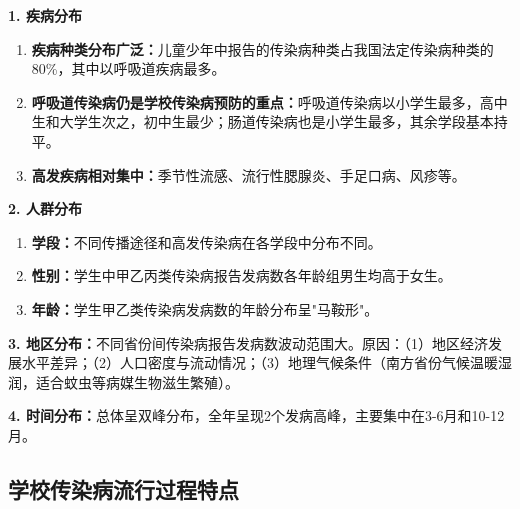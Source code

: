 \begin{keybox}
\textbf{1. 疾病分布}
\begin{enumerate}[leftmargin=*]
    \item \textbf{疾病种类分布广泛：}儿童少年中报告的传染病种类占我国法定传染病种类的80\%，其中以呼吸道疾病最多。
    \item \textbf{呼吸道传染病仍是学校传染病预防的重点：}呼吸道传染病以小学生最多，高中生和大学生次之，初中生最少；肠道传染病也是小学生最多，其余学段基本持平。
    \item \textbf{高发疾病相对集中：}季节性流感、流行性腮腺炎、手足口病、风疹等。
\end{enumerate}

\textbf{2. 人群分布}
\begin{enumerate}[leftmargin=*]
    \item \textbf{学段：}不同传播途径和高发传染病在各学段中分布不同。
    \item \textbf{性别：}学生中甲乙丙类传染病报告发病数各年龄组男生均高于女生。
    \item \textbf{年龄：}学生甲乙类传染病发病数的年龄分布呈"马鞍形"。
\end{enumerate}

\textbf{3. 地区分布：}不同省份间传染病报告发病数波动范围大。原因：（1）地区经济发展水平差异；（2）人口密度与流动情况；（3）地理气候条件（南方省份气候温暖湿润，适合蚊虫等病媒生物滋生繁殖）。

\textbf{4. 时间分布：}总体呈双峰分布，全年呈现2个发病高峰，主要集中在3-6月和10-12月。
\end{keybox}

\subsection{学校传染病流行过程特点}

